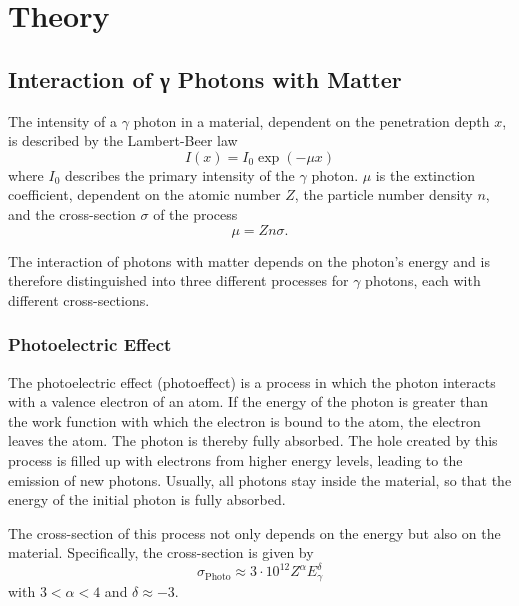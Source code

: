 \section{Theory}
\label{sec:theory}
\subsection{Interaction of γ Photons with Matter}
\label{sec:process}

\noindent
The intensity of a $\gamma$ photon in a material, dependent on 
the penetration depth $x$, is described by the Lambert-Beer law
\begin{equation}
    I(x) = I_0 \exp{(-\mu x)}
\end{equation}
where $I_0$ describes the primary intensity of the $\gamma$ 
photon. $\mu$ is the extinction coefficient, dependent on the 
atomic number $Z$, the particle number density $n$, and the 
cross-section $\sigma$ of the process
\begin{equation}
    \mu = Z n \sigma.
\end{equation}

\noindent
The interaction of photons with matter depends on the photon's 
energy and is therefore distinguished into three different 
processes for $\gamma$ photons, each with different cross-sections.

\subsubsection*{Photoelectric Effect}
The photoelectric effect (photoeffect) is a process in which the 
photon interacts with a valence electron of an atom. If the energy 
of the photon is greater than the work function with which the 
electron is bound to the atom, the electron leaves the atom. The 
photon is thereby fully absorbed. The hole created by this process 
is filled up with electrons from higher energy levels, leading to 
the emission of new photons. Usually, all photons stay inside the 
material, so that the energy of the initial photon is fully absorbed.

\noindent
The cross-section of this process not only depends on the energy but 
also on the material. Specifically, the cross-section is given by
\begin{equation}
    \sigma_\text{Photo}\approx 3\cdot 10^{12} Z^\alpha E_\gamma^\delta
\end{equation}
with $3<\alpha<4$ and $\delta\approx -3$. 

